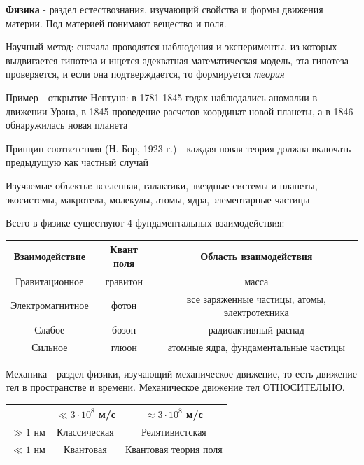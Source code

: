 \documentclass[12pt]{article}
\begin{document}
    \textbf{Физика} - раздел естествознания, изучающий свойства и формы движения материи.
    Под материей понимают вещество и поля.

    Научный метод: сначала проводятся наблюдения и эксперименты, из которых выдвигается гипотеза и ищется
    адекватная математическая модель, эта гипотеза проверяется, и если она подтверждается,
    то формируется \textit{теория}

    Пример - открытие Нептуна: в 1781-1845 годах наблюдались аномалии в движении Урана, в 1845 проведение расчетов
    координат новой планеты, а в 1846 обнаружилась новая планета

    Принцип соответствия (Н. Бор, 1923 г.) - каждая новая теория должна включать предыдущую как частный случай

    Изучаемые объекты: вселенная, галактики, звездные системы и планеты, экосистемы, макротела, молекулы, атомы, ядра,
    элементарные частицы

    Всего в физике существуют 4 фундаментальных взаимодействия:

    \begin{tabular}{c|c|c}
        Взаимодействие   & Квант поля & Область взаимодействия                        \\ \hline
        Гравитационное   & гравитон   & масса                                         \\
        Электромагнитное & фотон      & все заряженные частицы, атомы, электротехника \\
        Слабое           & бозон      & радиоактивный распад                          \\
        Сильное          & глюон      & атомные ядра, фундаментальные частицы         \\
    \end{tabular}

    Механика - раздел физики, изучающий механическое движение, то есть движение тел в пространстве и времени.
    Механическое движение тел ОТНОСИТЕЛЬНО.

    \begin{tabular}{c|c|c|}
        & $\ll 3 \cdot 10^8$ м/с & $\approx 3 \cdot 10^8$ м/с \\ \hline
        $\gg 1$ нм & Классическая           & Релятивистская             \\ \hline
        $\ll 1$ нм & Квантовая              & Квантовая теория поля      \\ \hline
    \end{tabular}
\end{document}
